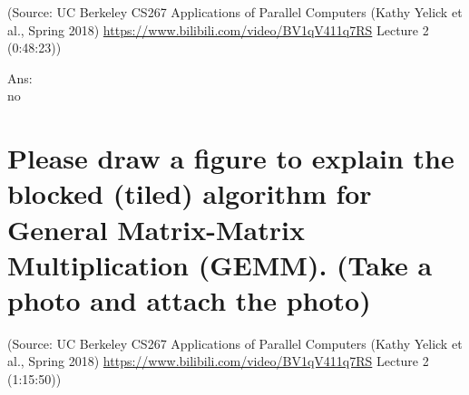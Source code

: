 \documentclass{article}
\begin{document}
\begin{figure}[htbp]
\centering
{}
\end{figure}

(Source: UC Berkeley CS267 Applications of Parallel Computers (Kathy Yelick et al., Spring 2018) \url{https://www.bilibili.com/video/BV1qV411q7RS} Lecture 2 (0:48:23))

Ans:%
~\\
no
\section{Please draw a figure to explain the blocked (tiled) algorithm for General Matrix-Matrix Multiplication (GEMM). (Take a photo and attach the photo)}
(Source: UC Berkeley CS267 Applications of Parallel Computers (Kathy Yelick et al., Spring 2018) \url{https://www.bilibili.com/video/BV1qV411q7RS} Lecture 2 (1:15:50))
\end{document}
